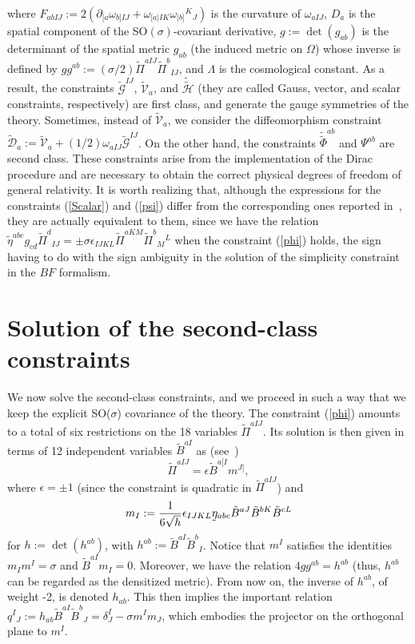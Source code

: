 \documentclass[aps,prd,reprint,showpacs,longbibliography,superscriptaddress, groupedaddres,
titlepage,nofootinbib]{revtex4-1} %
\begin{document}
where $F_{abIJ}:=2\left(\partial_{[a}\omega_{b]IJ}+\omega_{[a|IK}\omega_{|b]}{}^K{}_J\right)$ is the curvature of $\omega_{aIJ}$, $D_a$ is the spatial component of the SO$(\sigma)$-covariant derivative, $g:=\det(g_{ab})$ is the determinant of the spatial metric $g_{ab}$ (the induced metric on $\Omega$) whose inverse is defined by $gg^{ab}:=(\sigma/2)\tilde{\Pi}^{aIJ}\tilde{\Pi}^{b}{}_{IJ}$, and $\Lambda$ is the cosmological constant. As a result, the constraints $\tilde{\mathcal{G}}^{IJ}$, $\tilde{\mathcal{V}}_a$, and 
$\tilde{\tilde{\mathcal{H}}}$ (they are called Gauss, vector, and scalar constraints, respectively) are first class, and generate the gauge symmetries of the theory. Sometimes, instead of $\tilde{\mathcal{V}}_a$, we consider the diffeomorphism constraint $\tilde{\mathcal{D}}_a:=\tilde{\mathcal{V}}_a+(1/2)\omega_{aIJ}\tilde{\mathcal{G}}^{IJ}$. On the other hand, the constraints $\tilde{\tilde{\Phi}}^{ab}$ and $\Psi^{ab}$ are second class. These constraints arise from the implementation of the Dirac procedure and are necessary to obtain the correct physical degrees of freedom of general relativity. It is worth realizing that, although the expressions for the constraints (\ref{Scalar}) and (\ref{psi}) differ from the corresponding ones reported in~\cite{CelMontcqg2920}, they are actually equivalent to them, since we have the relation $\tilde{\eta}^{abc}g_{cd}\tilde{\Pi}^d{}_{IJ}=\pm \sigma\epsilon_{IJKL}\tilde{\Pi}^{aKM}\tilde{\Pi}^b{}_M{}^L$ when the constraint (\ref{phi}) holds, the sign having to do with the sign ambiguity in the solution of the simplicity constraint in the $BF$ formalism.



\section{Solution of the second-class constraints}
We now solve the second-class constraints, and we proceed in such a way that we keep the explicit SO($\sigma$) covariance of the theory. The constraint (\ref{phi}) amounts to a total of six restrictions on the 18 variables $\tilde{\Pi}^{aIJ}$. Its solution is then given in terms of 12 independent variables $\tilde{B}^{aI}$ as (see~\cite{ashtekar1991lectures,peld1994115})
\begin{equation}\label{sol2nd}
	\tilde{\Pi}^{aIJ}=\epsilon\tilde{B}^{a[I}m^{J]},
\end{equation}
where $\epsilon=\pm1$ (since the constraint is quadratic in $\tilde{\Pi}^{aIJ}$) and
\begin{equation}\label{intm}
	m_I:=\frac{1}{6\sqrt{h}}\epsilon_{IJKL}\underaccent{\tilde}{\eta}_{abc}\tilde{B}^{aJ}\tilde{B}^{bK}\tilde{B}^{cL}
\end{equation}
for $h:=\det(h^{ab})$, with $h^{ab}:=\tilde{B}^{aI}\tilde{B}^b{}_{I}$. Notice that $m^I$ satisfies the identities $m_Im^I=\sigma$ and $\tilde{B}^{aI}m_I=0$. Moreover, we have the relation $4gg^{ab}=h^{ab}$ (thus, $h^{ab}$ can be regarded as the densitized metric). From now on, the inverse of $h^{ab}$, of weight -2, is denoted $h_{ab}$. This then implies the important relation $q^I{}_J:=h_{ab}\tilde{B}^{aI}\tilde{B}^b{}_J=\delta^I_J-\sigma m^Im_J$, which embodies the projector on the orthogonal plane to $m^I$.
\end{document}
